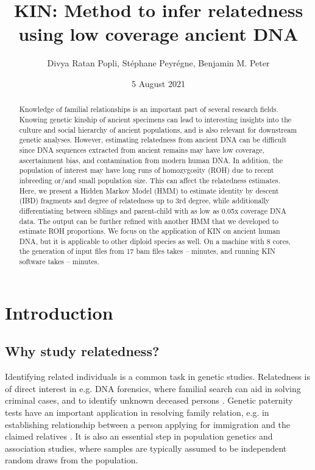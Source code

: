 \documentclass[12pt, letterpaper]{article}
\title{KIN: Method to infer relatedness using low coverage ancient DNA}
\author{Divya Ratan Popli, Stéphane Peyrégne, Benjamin M. Peter}
\date{5 August 2021}
\begin{document}
\nolinenumbers

\maketitle

\begin{abstract}

\noindent Knowledge of familial relationships is an important part of several research fields. Knowing genetic kinship of ancient specimens can lead to interesting insights into the culture and social hierarchy of ancient populations, and is also relevant for downstream genetic analyses. However, estimating relatedness from ancient DNA can be difficult since DNA sequences extracted from ancient remains may have low coverage, ascertainment bias, and contamination from modern human DNA. In addition, the population of interest may have long runs of homozygosity (ROH) due to recent inbreeding or/and small population size. This can affect the relatedness estimates. Here, we present a Hidden Markov Model (HMM) to estimate identity by descent (IBD) fragments and degree of relatedness up to 3rd degree, while additionally differentiating between siblings and parent-child with as low as 0.05x coverage DNA data. The output can be further refined with another HMM that we developed to estimate ROH proportions. We focus on the application of KIN on ancient human DNA, but it is applicable to other diploid species as well. On a machine with 8 cores, the generation of input files from 17 bam files takes -- minutes, and running KIN software takes -- minutes.
\end{abstract}

\section{Introduction}

\subsection{Why study relatedness?}

Identifying related individuals is a common task in genetic studies. Relatedness is of direct interest in e.g. DNA forensics, where familial search can aid in solving criminal cases, and to identify unknown deceased persons \cite{murphy_law_2018,ram_genealogy_2018}. Genetic paternity tests have an important application in resolving family relation, e.g. in establishing relationship between a person applying for immigration and the claimed relatives \cite{egeland_beyond_2000}. It is also an essential  step in population genetics and association studies, where samples are typically assumed to be independent random draws from the population.
\end{document}
